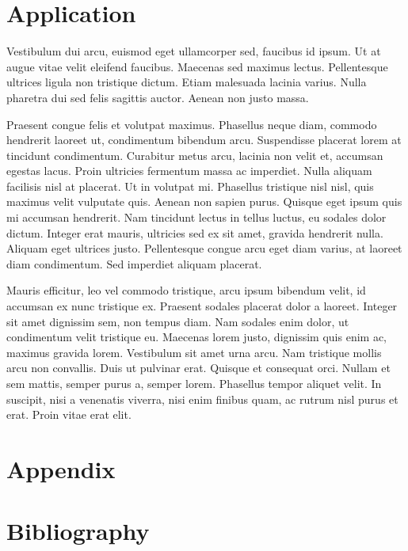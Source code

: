 \documentclass[11pt,twoside,a4paper]{article}
\begin{document}
	\section{Application}
	Vestibulum dui arcu, euismod eget ullamcorper sed, faucibus id ipsum. Ut at augue vitae velit eleifend faucibus. Maecenas sed maximus lectus. Pellentesque ultrices ligula non tristique dictum. Etiam malesuada lacinia varius. Nulla pharetra dui sed felis sagittis auctor. Aenean non justo massa.
	
	Praesent congue felis et volutpat maximus. Phasellus neque diam, commodo hendrerit laoreet ut, condimentum bibendum arcu. Suspendisse placerat lorem at tincidunt condimentum. Curabitur metus arcu, lacinia non velit et, accumsan egestas lacus. Proin ultricies fermentum massa ac imperdiet. Nulla aliquam facilisis nisl at placerat. Ut in volutpat mi. Phasellus tristique nisl nisl, quis maximus velit vulputate quis. Aenean non sapien purus. Quisque eget ipsum quis mi accumsan hendrerit. Nam tincidunt lectus in tellus luctus, eu sodales dolor dictum. Integer erat mauris, ultricies sed ex sit amet, gravida hendrerit nulla. Aliquam eget ultrices justo. Pellentesque congue arcu eget diam varius, at laoreet diam condimentum. Sed imperdiet aliquam placerat.
	
	Mauris efficitur, leo vel commodo tristique, arcu ipsum bibendum velit, id accumsan ex nunc tristique ex. Praesent sodales placerat dolor a laoreet. Integer sit amet dignissim sem, non tempus diam. Nam sodales enim dolor, ut condimentum velit tristique eu. Maecenas lorem justo, dignissim quis enim ac, maximus gravida lorem. Vestibulum sit amet urna arcu. Nam tristique mollis arcu non convallis. Duis ut pulvinar erat. Quisque et consequat orci. Nullam et sem mattis, semper purus a, semper lorem. Phasellus tempor aliquet velit. In suscipit, nisi a venenatis viverra, nisi enim finibus quam, ac rutrum nisl purus et erat. Proin vitae erat elit.
	\cite{kokoszka_introduction_2017}
	
	\section{Appendix}
	
	\section{Bibliography}
	\printbibliography[heading=none]	
	
\end{document}
